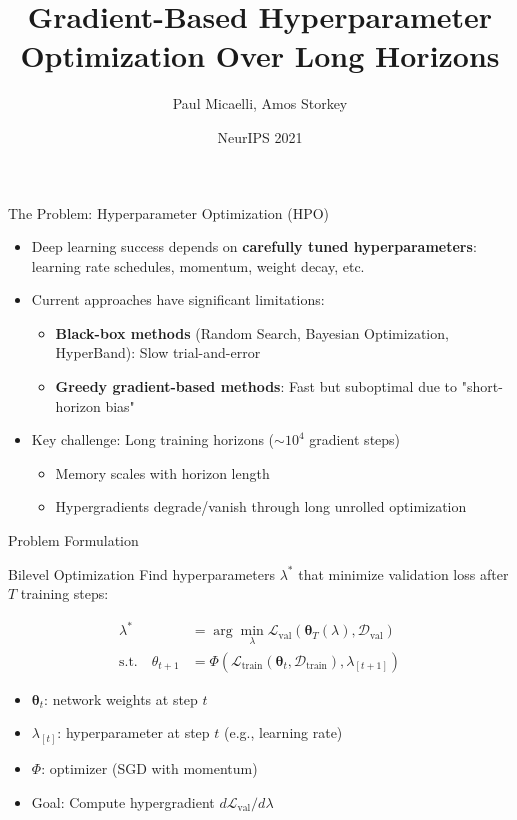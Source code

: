 \documentclass{beamer}
\title{Gradient-Based Hyperparameter Optimization Over Long Horizons}
\author{Paul Micaelli, Amos Storkey}
\institute{Talk by: Fedor Sobolevsky}
\date{NeurIPS 2021}
\begin{document}
\begin{frame}
\titlepage
\end{frame}

\begin{frame}{The Problem: Hyperparameter Optimization (HPO)}
\begin{itemize}
    \item Deep learning success depends on \textbf{carefully tuned hyperparameters}: learning rate schedules, momentum, weight decay, etc.
    \item Current approaches have significant limitations:
    \begin{itemize}
        \item \textbf{Black-box methods} (Random Search, Bayesian Optimization, HyperBand): Slow trial-and-error
        \item \textbf{Greedy gradient-based methods}: Fast but suboptimal due to "short-horizon bias"
    \end{itemize}
    \item Key challenge: Long training horizons (\(\sim 10^4\) gradient steps)
    \begin{itemize}
        \item Memory scales with horizon length
        \item Hypergradients degrade/vanish through long unrolled optimization
    \end{itemize}
\end{itemize}
\end{frame}

\begin{frame}{Problem Formulation}
\begin{block}{Bilevel Optimization}
Find hyperparameters \(\lambda^*\) that minimize validation loss after \(T\) training steps:

\begin{align*}
\lambda^* &= \arg \min_{\lambda} \mathcal{L}_{\text{val}}(\bm{\theta}_T(\lambda), \mathcal{D}_{\text{val}}) \\
\text{s.t.} \quad \theta_{t+1} &= \Phi(\mathcal{L}_{\text{train}}(\bm{\theta}_t, \mathcal{D}_{\text{train}}), \lambda_{[t+1]})
\end{align*}
\end{block}

\vspace{0.3cm}
\begin{itemize}
    \item \(\bm{\theta}_t\): network weights at step \(t\)
    \item \(\lambda_{[t]}\): hyperparameter at step \(t\) (e.g., learning rate)
    \item \(\Phi\): optimizer (SGD with momentum)
    \item Goal: Compute hypergradient \(d\mathcal{L}_{\text{val}}/d\lambda\)
\end{itemize}
\end{frame}
\end{document}
